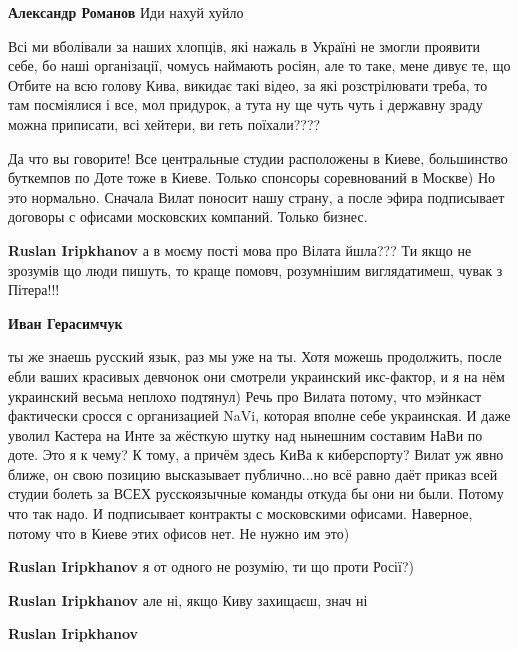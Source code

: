 \begin{itemize}
\begin{itemize}
\begin{itemize}
\textbf{Александр Романов}
Иди нахуй хуйло
\end{itemize} %

\end{itemize} %


Всі ми вболівали за наших хлопців, які нажаль в Україні не змогли проявити
себе, бо наші організації, чомусь наймають росіян, але то таке, мене дивує те,
що Отбите на всю голову Кива, викидає такі відео, за які розстрілювати треба,
то там посміялися і все, мол придурок, а тута ну ще чуть чуть і державну зраду
можна приписати, всі хейтери, ви геть поїхали????

\begin{itemize} %

Да что вы говорите! Все центральные студии расположены в Киеве, большинство
буткемпов по Доте тоже в Киеве. Только спонсоры соревнований в Москве) Но это
нормально. Сначала Вилат поносит нашу страну, а после эфира подписывает
договоры с офисами московских компаний. Только бизнес.

\begin{itemize} %
\textbf{Ruslan Iripkhanov} а в моєму пості мова про Вілата йшла??? Ти якщо не зрозумів що люди пишуть, то краще помовч, розумнішим виглядатимеш, чувак з Пітера!!!

\textbf{Иван Герасимчук} 

ты же знаешь русский язык, раз мы уже на ты. Хотя можешь продолжить, после ебли
ваших красивых девчонок они смотрели украинский икс-фактор, и я на нём
украинский весьма неплохо подтянул) Речь про Вилата потому, что мэйнкаст
фактически сросся с организацией NaVi, которая вполне себе украинская. И даже
уволил Кастера на Инте за жёсткую шутку над нынешним составим НаВи по доте. Это
я к чему? К тому, а причём здесь КиВа к киберспорту? Вилат уж явно ближе, он
свою позицию высказывает публично...но всё равно даёт приказ всей студии болеть
за ВСЕХ русскоязычные команды откуда бы они ни были. Потому что так надо. И
подписывает контракты с московскими офисами. Наверное, потому что в Киеве этих
офисов нет. Не нужно им это)


\textbf{Ruslan Iripkhanov} я от одного не розумію, ти що проти Росії?)

\textbf{Ruslan Iripkhanov} але ні, якщо Киву захищаєш, знач ні

\textbf{Ruslan Iripkhanov} 


\end{itemize}
\end{itemize}
\end{itemize}
